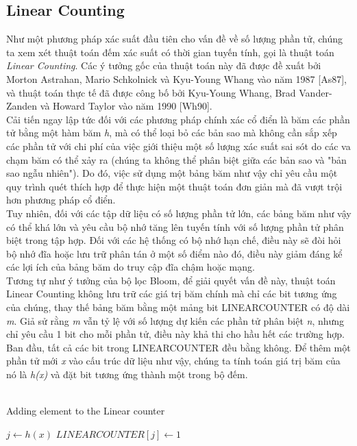 \documentclass[a4paper,13pt]{article}
\theoremstyle{mytheor}
\begin{document}
\subsection{Linear Counting}
\indent Như một phương pháp xác suất đầu tiên cho vấn đề về số lượng phần tử, chúng ta xem xét thuật toán đếm xác suất có thời gian tuyến tính, 
gọi là thuật toán \textit{Linear Counting}. Các ý tưởng gốc của thuật toán này đã được đề xuất bởi Morton Astrahan, Mario Schkolnick và Kyu-Young Whang 
vào năm 1987 [As87], và thuật toán thực tế đã được công bố bởi Kyu-Young Whang, Brad Vander-Zanden và Howard Taylor vào năm 1990 [Wh90].\\
Cải tiến ngay lập tức đối với các phương pháp chính xác cổ điển là băm các phần tử bằng một hàm băm \textit{h}, mà có thể loại bỏ các bản sao mà 
không cần sắp xếp các phần tử với chi phí của việc giới thiệu một số lượng xác suất sai sót do các va chạm băm có thể 
xảy ra (chúng ta không thể phân biệt giữa các bản sao và "bản sao ngẫu nhiên"). Do đó, việc sử dụng một bảng băm như vậy chỉ yêu cầu một 
quy trình quét thích hợp để thực hiện một thuật toán đơn giản mà đã vượt trội hơn phương pháp cổ điển.\\
\indent Tuy nhiên, đối với các tập dữ liệu có số lượng phần tử lớn, các bảng băm như vậy có thể khá lớn và yêu cầu bộ nhớ tăng lên tuyến tính với 
số lượng phần tử phân biệt trong tập hợp. Đối với các hệ thống có bộ nhớ hạn chế, điều này sẽ đòi hỏi bộ nhớ đĩa hoặc lưu trữ phân tán ở một số 
điểm nào đó, điều này giảm đáng kể các lợi ích của bảng băm do truy cập đĩa chậm hoặc mạng.\\
\indent Tương tự như ý tưởng của bộ lọc Bloom, để giải quyết vấn đề này, thuật toán Linear Counting không lưu trữ các giá trị băm chính mà chỉ 
các bit tương ứng của chúng, thay thế bảng băm bằng một mảng bit LINEARCOUNTER có độ dài \textit{m}. Giả sử rằng \textit{m} vẫn tỷ lệ với 
số lượng dự kiến các phần tử phân biệt \textit{n}, nhưng chỉ yêu cầu 1 bit cho mỗi phần tử, điều này khả thi cho hầu hết các trường hợp.\\
\indent Ban đầu, tất cả các bit trong LINEARCOUNTER đều bằng không. Để thêm một phần tử mới \textit{x} vào cấu trúc dữ liệu như vậy, 
chúng ta tính toán giá trị băm của nó là \textit{h(x)} và đặt bit tương ứng thành một trong bộ đếm.\\\\
\vspace{0.5cm}
\begin{algorithm}[H]
    \DontPrintSemicolon
    \LinesNumberedHidden
    \caption[]{Adding element to the Linear counter}
    $j \gets h(x)$\;
    {
        $LINEARCOUNTER[j]\gets 1$
    }
\end{algorithm}
\end{document}
